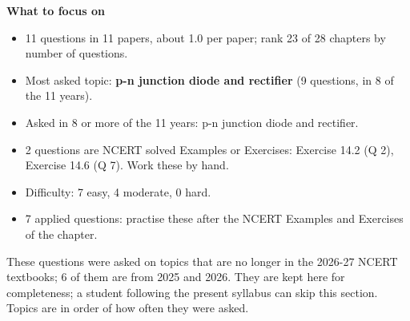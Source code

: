 \begin{minipage}[t]{0.63\linewidth}{\small\textbf{\color{crimson}What to focus on}\par\smallskip
\begin{itemize}[leftmargin=1.1em,itemsep=1pt,topsep=0pt]
\item 11 questions in 11 papers, about 1.0 per paper; rank 23 of 28 chapters by number of questions.
\item Most asked topic: \textbf{p-n junction diode and rectifier} (9 questions, in 8 of the 11 years).
\item Asked in 8 or more of the 11 years: p-n junction diode and rectifier.
\item 2 questions are NCERT solved Examples or Exercises: Exercise 14.2 (Q 2), Exercise 14.6 (Q 7). Work these by hand.
\item Difficulty: 7 easy, 4 moderate, 0 hard.
\item 7 applied questions: practise these after the NCERT Examples and Exercises of the chapter.
\end{itemize}}\end{minipage}\par
{}
{\small These questions were asked on topics that are no longer in the 2026-27 NCERT textbooks; 6 of them are from 2025 and 2026. They are kept here for completeness; a student following the present syllabus can skip this section. Topics are in order of how often they were asked.}\par\medskip
